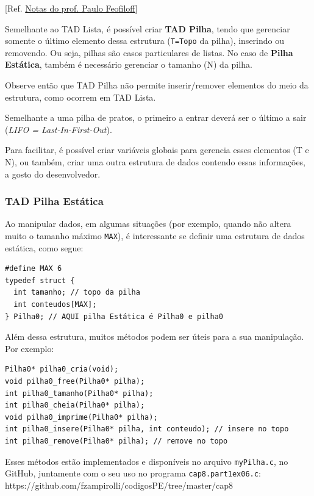 \documentclass[12pt,a4paper]{article}
\begin{document}
    {[}Ref.
\href{https://www.ime.usp.br/~pf/algoritmos/aulas/pilha.html}{Notas do
prof. Paulo Feofiloff}{]}

Semelhante ao TAD Lista, é possível criar \textbf{TAD Pilha}, tendo que
gerenciar somente o último elemento dessa estrutura (\texttt{T=Topo} da
pilha), inserindo ou removendo. Ou seja, pilhas são casos particulares
de listas. No caso de \textbf{Pilha Estática}, também é necessário
gerenciar o tamanho (N) da pilha.

Observe então que TAD Pilha não permite inserir/remover elementos do
meio da estrutura, como ocorrem em TAD Lista.

Semelhante a uma pilha de pratos, o primeiro a entrar deverá ser o
último a sair (\emph{LIFO = Last-In-First-Out}).

Para facilitar, é possível criar variáveis globais para gerencia esses
elementos (T e N), ou também, criar uma outra estrutura de dados
contendo essas informações, a gosto do desenvolvedor.

    \hypertarget{tad-pilha-estuxe1tica}{%
\subsubsection{TAD Pilha Estática}\label{tad-pilha-estuxe1tica}}

    Ao manipular dados, em algumas situações (por exemplo, quando não altera
muito o tamanho máximo \texttt{MAX}), é interessante se definir uma
estrutura de dados estática, como segue:

\begin{verbatim}
#define MAX 6
typedef struct {
  int tamanho; // topo da pilha
  int conteudos[MAX];
} Pilha0; // AQUI pilha Estática é Pilha0 e pilha0
\end{verbatim}

Além dessa estrutura, muitos métodos podem ser úteis para a sua
manipulação. Por exemplo:

\begin{verbatim}
Pilha0* pilha0_cria(void);
void pilha0_free(Pilha0* pilha);
int pilha0_tamanho(Pilha0* pilha);
int pilha0_cheia(Pilha0* pilha);
void pilha0_imprime(Pilha0* pilha);
int pilha0_insere(Pilha0* pilha, int conteudo); // insere no topo
int pilha0_remove(Pilha0* pilha); // remove no topo
\end{verbatim}

Esses métodos estão implementados e disponíveis no arquivo
\texttt{myPilha.c}, no GitHub, juntamente com o seu uso no programa
\texttt{cap8.part1ex06.c}:
https://github.com/fzampirolli/codigosPE/tree/master/cap8
\end{document}
